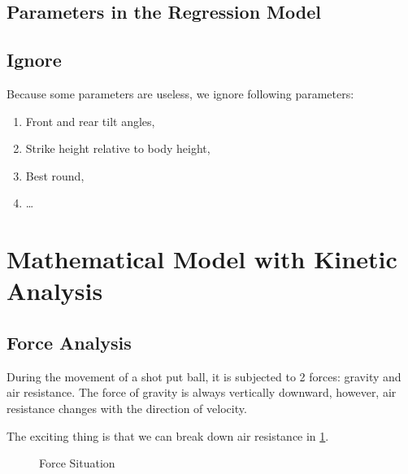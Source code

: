 \documentclass{article}
\begin{document}
\subsection{Parameters in the Regression Model}

\subsection{Ignore}

Because some parameters are useless, we ignore following parameters:

\begin{enumerate}
    \item Front and rear tilt angles,
    \item Strike height relative to body height,
    \item Best round,
    \item \dots
\end{enumerate}

\section{Mathematical Model with Kinetic Analysis}

\subsection{Force Analysis}

During the movement of a shot put ball, it is subjected to 2 forces: gravity and air resistance. The force of gravity is always vertically downward, however, air resistance changes with the direction of velocity.

The exciting thing is that we can break down air resistance in \ref{fig:force-situation}.

\begin{figure}[H]
    \centering
    \caption{Force Situation}
    \label{fig:force-situation}
\end{figure}
\end{document}
